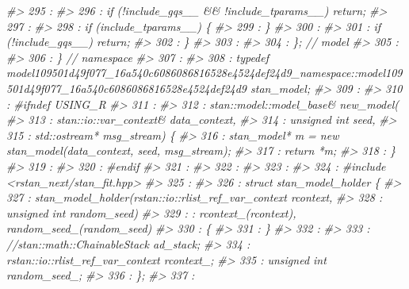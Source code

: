 \documentclass[
  10pt,
  italian,
  a4paper,
  extrafontsizes,onecolumn,openright
  ]{memoir}
\newenvironment{Shaded}{\begin{snugshade}}{\end{snugshade}}
\newcommand{\CommentTok}[1]{\textcolor[rgb]{0.56,0.35,0.01}{\textit{#1}}}
\begin{document}
\begin{Shaded}
\begin{Highlighting}[]
\CommentTok{\#\textgreater{}  295 : }
\CommentTok{\#\textgreater{}  296 :         if (!include\_gqs\_\_ \&\& !include\_tparams\_\_) return;}
\CommentTok{\#\textgreater{}  297 : }
\CommentTok{\#\textgreater{}  298 :         if (include\_tparams\_\_) \{}
\CommentTok{\#\textgreater{}  299 :         \}}
\CommentTok{\#\textgreater{}  300 : }
\CommentTok{\#\textgreater{}  301 :         if (!include\_gqs\_\_) return;}
\CommentTok{\#\textgreater{}  302 :     \}}
\CommentTok{\#\textgreater{}  303 : }
\CommentTok{\#\textgreater{}  304 : \}; // model}
\CommentTok{\#\textgreater{}  305 : }
\CommentTok{\#\textgreater{}  306 : \}  // namespace}
\CommentTok{\#\textgreater{}  307 : }
\CommentTok{\#\textgreater{}  308 : typedef model109501d49f077\_16a540c6086086816528e4524def24d9\_namespace::model109501d49f077\_16a540c6086086816528e4524def24d9 stan\_model;}
\CommentTok{\#\textgreater{}  309 : }
\CommentTok{\#\textgreater{}  310 : \#ifndef USING\_R}
\CommentTok{\#\textgreater{}  311 : }
\CommentTok{\#\textgreater{}  312 : stan::model::model\_base\& new\_model(}
\CommentTok{\#\textgreater{}  313 :         stan::io::var\_context\& data\_context,}
\CommentTok{\#\textgreater{}  314 :         unsigned int seed,}
\CommentTok{\#\textgreater{}  315 :         std::ostream* msg\_stream) \{}
\CommentTok{\#\textgreater{}  316 :   stan\_model* m = new stan\_model(data\_context, seed, msg\_stream);}
\CommentTok{\#\textgreater{}  317 :   return *m;}
\CommentTok{\#\textgreater{}  318 : \}}
\CommentTok{\#\textgreater{}  319 : }
\CommentTok{\#\textgreater{}  320 : \#endif}
\CommentTok{\#\textgreater{}  321 : }
\CommentTok{\#\textgreater{}  322 : }
\CommentTok{\#\textgreater{}  323 : }
\CommentTok{\#\textgreater{}  324 : \#include \textless{}rstan\_next/stan\_fit.hpp\textgreater{}}
\CommentTok{\#\textgreater{}  325 : }
\CommentTok{\#\textgreater{}  326 : struct stan\_model\_holder \{}
\CommentTok{\#\textgreater{}  327 :     stan\_model\_holder(rstan::io::rlist\_ref\_var\_context rcontext,}
\CommentTok{\#\textgreater{}  328 :                       unsigned int random\_seed)}
\CommentTok{\#\textgreater{}  329 :     : rcontext\_(rcontext), random\_seed\_(random\_seed)}
\CommentTok{\#\textgreater{}  330 :      \{}
\CommentTok{\#\textgreater{}  331 :      \}}
\CommentTok{\#\textgreater{}  332 : }
\CommentTok{\#\textgreater{}  333 :    //stan::math::ChainableStack ad\_stack;}
\CommentTok{\#\textgreater{}  334 :    rstan::io::rlist\_ref\_var\_context rcontext\_;}
\CommentTok{\#\textgreater{}  335 :    unsigned int random\_seed\_;}
\CommentTok{\#\textgreater{}  336 : \};}
\CommentTok{\#\textgreater{}  337 : }

\end{Highlighting}
\end{Shaded}
\end{document}
